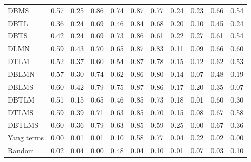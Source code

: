 \begin{longtable}{@{}lrrrrrrrrrr@{}}
DBMS & 0.57 & 0.25 & 0.86 & 0.74 & 0.87 & 0.77 & 0.24 & 0.23 & 0.66 & 0.54 \\
DBTL & 0.36 & 0.24 & 0.69 & 0.46 & 0.84 & 0.68 & 0.20 & 0.10 & 0.45 & 0.24 \\
DBTS & 0.42 & 0.24 & 0.69 & 0.73 & 0.86 & 0.61 & 0.22 & 0.27 & 0.61 & 0.54 \\
DLMN & 0.59 & 0.43 & 0.70 & 0.65 & 0.87 & 0.83 & 0.11 & 0.09 & 0.66 & 0.60 \\
DTLM & 0.52 & 0.37 & 0.60 & 0.54 & 0.87 & 0.78 & 0.15 & 0.12 & 0.62 & 0.53 \\
DBLMN & 0.57 & 0.30 & 0.74 & 0.62 & 0.86 & 0.80 & 0.14 & 0.07 & 0.48 & 0.19 \\
DBLMS & 0.60 & 0.42 & 0.79 & 0.75 & 0.87 & 0.86 & 0.17 & 0.20 & 0.35 & 0.07 \\
DBTLM & 0.51 & 0.15 & 0.65 & 0.46 & 0.85 & 0.73 & 0.18 & 0.01 & 0.60 & 0.30 \\
DTLMS & 0.59 & 0.39 & 0.71 & 0.63 & 0.85 & 0.70 & 0.15 & 0.08 & 0.67 & 0.58 \\
DBTLMS & 0.60 & 0.36 & 0.79 & 0.63 & 0.85 & 0.59 & 0.25 & 0.00 & 0.67 & 0.36 \\
Yang terms & 0.00 & 0.01 & 0.01 & 0.10 & 0.58 & 0.77 & 0.04 & 0.22 & 0.02 & 0.00 \\
Random & 0.02 & 0.04 & 0.00 & 0.48 & 0.04 & 0.10 & 0.01 & 0.07 & 0.03 & 0.10 \\
\end{longtable}
